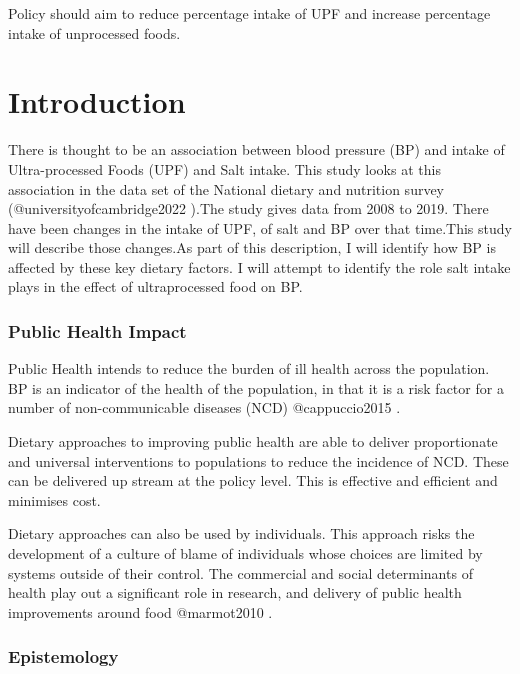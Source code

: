 \documentclass[
]{article}
\begin{document}
Policy should aim to reduce percentage intake of UPF and increase
percentage intake of unprocessed foods.

\tableofcontents
\listoffigures
\listoftables
\newpage

\newpage

\hypertarget{introduction}{%
\section{Introduction}\label{introduction}}

There is thought to be an association between blood pressure (BP) and
intake of Ultra-processed Foods (UPF) and Salt intake. This study looks
at this association in the data set of the National dietary and
nutrition survey (@universityofcambridge2022 ).The study gives data from
2008 to 2019. There have been changes in the intake of UPF, of salt and
BP over that time.This study will describe those changes.As part of this
description, I will identify how BP is affected by these key dietary
factors. I will attempt to identify the role salt intake plays in the
effect of ultraprocessed food on BP.

\hypertarget{public-health-impact}{%
\subsubsection{Public Health Impact}\label{public-health-impact}}

Public Health intends to reduce the burden of ill health across the
population. BP is an indicator of the health of the population, in that
it is a risk factor for a number of non-communicable diseases (NCD)
@cappuccio2015 .

Dietary approaches to improving public health are able to deliver
proportionate and universal interventions to populations to reduce the
incidence of NCD. These can be delivered up stream at the policy level.
This is effective and efficient and minimises cost.

Dietary approaches can also be used by individuals. This approach risks
the development of a culture of blame of individuals whose choices are
limited by systems outside of their control. The commercial and social
determinants of health play out a significant role in research, and
delivery of public health improvements around food @marmot2010 .

\hypertarget{epistemology}{%
\subsubsection{Epistemology}\label{epistemology}}
\end{document}
